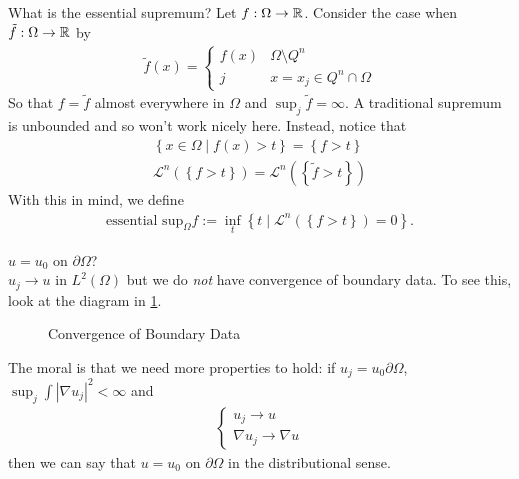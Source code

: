 \documentclass{memoir}
\begin{document}
\begin{rmrk}
What is the essential supremum? Let \(f:\Omega \to \mathbb{R}\). Consider the case when \(\tilde{f}:\Omega \to \mathbb{R}\) by
\begin{align*}
	\tilde{f}(x) = \begin{cases}
		f(x) & \Omega \setminus Q^{n}\\
		j & x = x_j \in Q^{n}\cap \Omega 
	\end{cases}
\end{align*}
So that \(f = \tilde{f}\) almost everywhere in \(\Omega \) and \(\sup_{j} \tilde{f}= \infty\). A traditional supremum is unbounded and so won't work nicely here. Instead, notice that
\begin{align*}
	\left\{x \in \Omega  \mid f(x) > t \right\} = \left\{f > t \right\} \\
	\mathcal{L}^{n}( \left\{ f > t \right\} ) = \mathcal{L}^{n}\left( \left\{ \tilde{f} > t \right\}  \right)
\end{align*}
With this in mind, we define
\begin{align*}
	\textrm{essential sup}_{\Omega } f := \inf_{t} \left\{ t\mid \mathcal{L}^{n}( \left\{f >t \right\} ) = 0 \right\} .
\end{align*}
\end{rmrk}

\begin{exmp}
	\(u=u_0\) on \(\partial \Omega \)?\\

	\(u_j \to u\) in \(L^2(\Omega )\) but we do \textit{not} have convergence of boundary data. To see this, look at the diagram in \ref{fig:convergence-of-boundary-data}.
\end{exmp}

\begin{figure}[ht]
    \centering
     \def\svgwidth{1\linewidth}
     
    \caption{Convergence of Boundary Data}
    \label{fig:convergence-of-boundary-data}
\end{figure}


The moral is that we need more properties to hold: if \(u_j = u_0 \partial \Omega \), \(\sup_{j} \int \left| \nabla u_j \right|^2 < \infty\) and
\begin{align*}
	\begin{cases}
		u_j \to u\\
		\nabla u_j \to \nabla u
	\end{cases}
\end{align*}
then we can say that \(u = u_0\) on \(\partial \Omega \) in the distributional sense.\\
\end{document}
